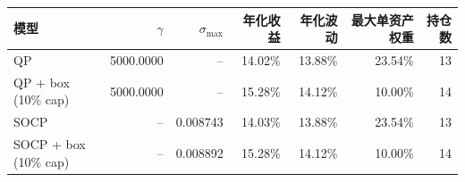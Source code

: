 \begin{center}
\small
\begin{tabular}{lrrrrrr}
\toprule
模型 & $\gamma$ & $\sigma_{\max}$ & 年化收益 & 年化波动 & 最大单资产权重 & 持仓数 \\
\midrule
QP & 5000.0000 & -- & 14.02\% & 13.88\% & 23.54\% & 13 \\
QP + box (10\% cap) & 5000.0000 & -- & 15.28\% & 14.12\% & 10.00\% & 14 \\
SOCP & -- & 0.008743 & 14.03\% & 13.88\% & 23.54\% & 13 \\
SOCP + box (10\% cap) & -- & 0.008892 & 15.28\% & 14.12\% & 10.00\% & 14 \\
\bottomrule
\end{tabular}
\end{center}